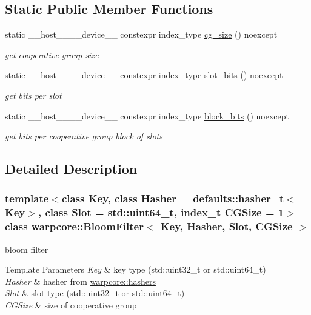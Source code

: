 \subsection*{Static Public Member Functions}
\begin{DoxyCompactItemize}
\item 
static \+\_\+\+\_\+host\+\_\+\+\_\+\+\_\+\+\_\+device\+\_\+\+\_\+ constexpr index\+\_\+type \hyperlink{classwarpcore_1_1BloomFilter_a6ad2335811852ad62fc65e85416d3904}{cg\+\_\+size} () noexcept
\begin{DoxyCompactList}\small\item\em get cooperative group size \end{DoxyCompactList}\item 
static \+\_\+\+\_\+host\+\_\+\+\_\+\+\_\+\+\_\+device\+\_\+\+\_\+ constexpr index\+\_\+type \hyperlink{classwarpcore_1_1BloomFilter_a8dca50765c601cca8d85621fa8488ecc}{slot\+\_\+bits} () noexcept
\begin{DoxyCompactList}\small\item\em get bits per slot \end{DoxyCompactList}\item 
static \+\_\+\+\_\+host\+\_\+\+\_\+\+\_\+\+\_\+device\+\_\+\+\_\+ constexpr index\+\_\+type \hyperlink{classwarpcore_1_1BloomFilter_ae7d326580b41b88db73264a494db3a06}{block\+\_\+bits} () noexcept
\begin{DoxyCompactList}\small\item\em get bits per cooperative group block of slots \end{DoxyCompactList}\end{DoxyCompactItemize}


\subsection{Detailed Description}
\subsubsection*{template$<$class Key, class Hasher = defaults\+::hasher\+\_\+t$<$\+Key$>$, class Slot = std\+::uint64\+\_\+t, index\+\_\+t C\+G\+Size = 1$>$\newline
class warpcore\+::\+Bloom\+Filter$<$ Key, Hasher, Slot, C\+G\+Size $>$}

bloom filter 


\begin{DoxyTemplParams}{Template Parameters}
{\em Key} & key type ({\ttfamily std\+::uint32\+\_\+t} or {\ttfamily std\+::uint64\+\_\+t}) \\
\hline
{\em Hasher} & hasher from {\ttfamily \hyperlink{namespacewarpcore_1_1hashers}{warpcore\+::hashers}} \\
\hline
{\em Slot} & slot type ({\ttfamily std\+::uint32\+\_\+t} or {\ttfamily std\+::uint64\+\_\+t}) \\
\hline
{\em C\+G\+Size} & size of cooperative group \\
\hline
\end{DoxyTemplParams}


